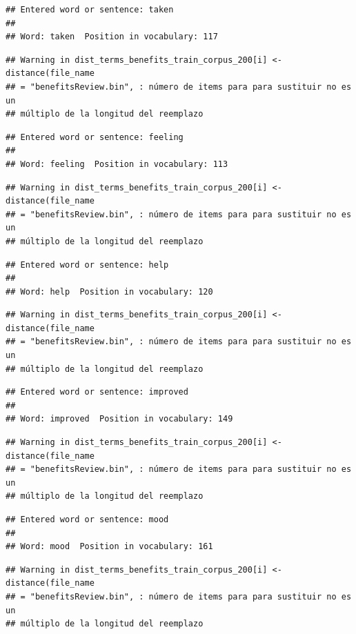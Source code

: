\documentclass[spanish,]{article}
\begin{document}
\begin{verbatim}
## Entered word or sentence: taken
## 
## Word: taken  Position in vocabulary: 117
\end{verbatim}

\begin{verbatim}
## Warning in dist_terms_benefits_train_corpus_200[i] <- distance(file_name
## = "benefitsReview.bin", : número de items para para sustituir no es un
## múltiplo de la longitud del reemplazo
\end{verbatim}

\begin{verbatim}
## Entered word or sentence: feeling
## 
## Word: feeling  Position in vocabulary: 113
\end{verbatim}

\begin{verbatim}
## Warning in dist_terms_benefits_train_corpus_200[i] <- distance(file_name
## = "benefitsReview.bin", : número de items para para sustituir no es un
## múltiplo de la longitud del reemplazo
\end{verbatim}

\begin{verbatim}
## Entered word or sentence: help
## 
## Word: help  Position in vocabulary: 120
\end{verbatim}

\begin{verbatim}
## Warning in dist_terms_benefits_train_corpus_200[i] <- distance(file_name
## = "benefitsReview.bin", : número de items para para sustituir no es un
## múltiplo de la longitud del reemplazo
\end{verbatim}

\begin{verbatim}
## Entered word or sentence: improved
## 
## Word: improved  Position in vocabulary: 149
\end{verbatim}

\begin{verbatim}
## Warning in dist_terms_benefits_train_corpus_200[i] <- distance(file_name
## = "benefitsReview.bin", : número de items para para sustituir no es un
## múltiplo de la longitud del reemplazo
\end{verbatim}

\begin{verbatim}
## Entered word or sentence: mood
## 
## Word: mood  Position in vocabulary: 161
\end{verbatim}

\begin{verbatim}
## Warning in dist_terms_benefits_train_corpus_200[i] <- distance(file_name
## = "benefitsReview.bin", : número de items para para sustituir no es un
## múltiplo de la longitud del reemplazo
\end{verbatim}
\end{document}
